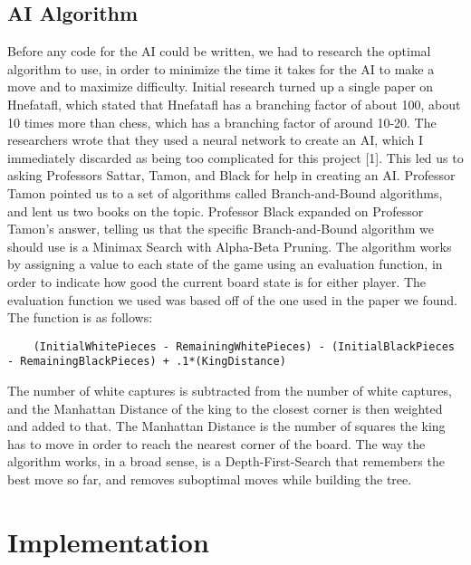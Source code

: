 \documentclass{article}
\begin{document}
\subsection{AI Algorithm}
	Before any code for the AI could be written, we had to research the optimal algorithm to use, in order to minimize the time it takes for the AI to make a move and to maximize difficulty. Initial research turned up a single paper on Hnefatafl, which stated that Hnefatafl has a branching factor of about 100, about 10 times more than chess, which has a branching factor of around 10-20. The researchers wrote that they used a neural network to create an AI, which I immediately discarded as being too complicated for this project [1]. This led us to asking Professors Sattar, Tamon, and Black for help in creating an AI. Professor Tamon pointed us to a set of algorithms called Branch-and-Bound algorithms, and lent us two books on the topic. Professor Black expanded on Professor Tamon's answer, telling us that the specific Branch-and-Bound algorithm we should use is a Minimax Search with Alpha-Beta Pruning. The algorithm works by assigning a value to each state of the game using an evaluation function, in order to indicate how good the current board state is for either player. The evaluation function we used was based off of the one used in the paper we found. The function is as follows:
\begin{lstlisting}
	(InitialWhitePieces - RemainingWhitePieces) - (InitialBlackPieces - RemainingBlackPieces) + .1*(KingDistance)
\end{lstlisting}
The number of white captures is subtracted from the number of white captures, and the Manhattan Distance of the king to the closest corner is then weighted and added to that. The Manhattan Distance is the number of squares the king has to move in order to reach the nearest corner of the board.
	The way the algorithm works, in a broad sense, is a Depth-First-Search that remembers the best move so far, and removes suboptimal moves while building the tree. 

\section{Implementation}
\end{document}
